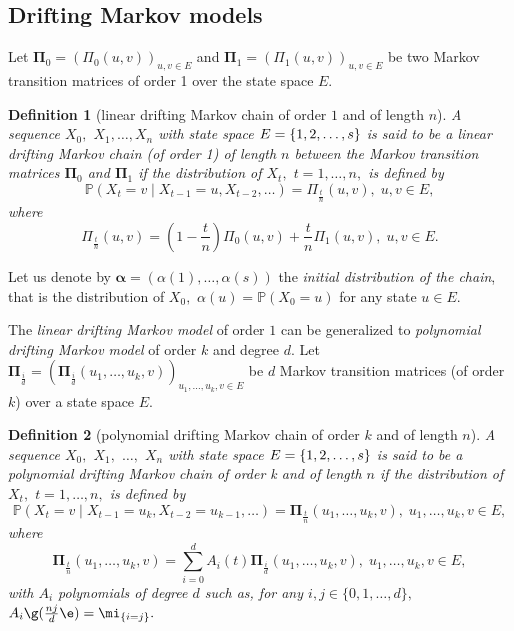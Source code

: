 \documentclass[article,nojss]{jss}\usepackage[]{graphicx}\usepackage[]{color}
\newtheorem{definition}{Definition}
\begin{document}
\subsection{Drifting Markov models} \label{subsection_DMM}


Let $\bm{\Pi}_0 = (\Pi_0(u, v))_{u,v \in E}$ and  $\bm{\Pi}_1 = (\Pi_1(u, v))_{u,v \in E}$ be two Markov transition matrices of order 1 over the state space $E.$

\begin{definition}[linear drifting Markov chain of order $1$ and of length $n$]\label{def_DriftLin}
A sequence $X_0,$ $X_1, \ldots, X_n$ with state space $E=\mathbb \{1, 2, \ldots, s\}$ is said to be a {\em linear drifting Markov chain (of order 1)} of length $n$ between the Markov transition matrices $\bm{\Pi}_0$ and  $\bm{\Pi}_1$ if the distribution of $X_t,$ $t = 1, \ldots, n,$ is defined by
\begin{equation}\label{eq_DriftLin1}
\mathbb P(X_t=v \mid X_{t-1}	= u, X_{t-2}, \ldots ) = \Pi_{\frac{t}{n}}(u, v), \; u, v \in E,
\end{equation}
where
\begin{equation}\label{eq_DriftLin2}
\Pi_{\frac{t}{n}}(u, v) = \left( 1 - \frac{t}{n} \right) \Pi_0(u, v) + \frac{t}{n} \Pi_1(u, v), \; u, v \in E.
\end{equation}
\end{definition}

Let us denote by $\bm{\alpha} = (\alpha(1), \ldots, \alpha(s))$ the \emph{initial distribution of the chain}, that is the distribution of $X_0,$ $\alpha(u)=\mathbb P (X_0 = u)$ for any state $u\in E.$

The {\em linear drifting Markov model} of order $1$ can be generalized to {\em polynomial drifting Markov model} of
order $k$ and degree $d$. Let $\bm{\Pi}_{\frac{i}{d}} = (\bm{\Pi}_{\frac{i}{d}}(u_1, \dots, u_k, v))_{u_1, \dots, u_k,v \in E}$ be $d$ Markov transition matrices (of order $k$) over a state space $E.$


\begin{definition}[polynomial drifting Markov chain of order $k$ and of length $n$]\label{def_DriftPol}
A sequence $X_0,$ $X_1,$ $\ldots,$ $X_n$ with state space $E=\mathbb \{1, 2, \ldots, s\}$ is said to be a {\em polynomial drifting Markov chain of order k} and of length $n$ if the distribution of $X_t,$ $t = 1, \ldots, n,$ is defined by
\begin{equation}\label{eq_DriftPol1}
\mathbb P(X_t=v \mid X_{t-1}	= u_k, X_{t-2}=u_{k-1}, \ldots ) = \bm{\Pi}_{\frac{t}{n}}(u_1, \dots, u_k, v), \; u_1, \dots, u_k, v \in E,
\end{equation}
where
\begin{equation}\label{eq_DriftPol2}
\bm{\Pi}_{\frac{t}{n}}(u_1, \dots, u_k, v) = \displaystyle\sum_{i=0}^d A_i(t)\bm{\Pi}_{\frac{i}{d}}(u_1, \dots, u_k,v), \; u_1, \dots, u_k, v \in E,
\end{equation}
with $A_i$ polynomials of degree $d$ such as, for any $i, j \in \{0, 1, \ldots, d\},$
$A_i\g(\frac{nj}{d}\e)=\mi_{\{i=j\}}.$
\end{definition}
\end{document}
